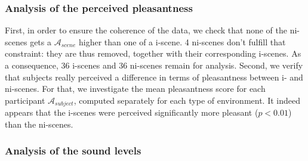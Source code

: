 \documentclass[12pt]{elsarticle}
\begin{document}
\subsubsection*{Analysis of the perceived pleasantness}


First, in order to ensure the coherence of the data, we check that none of the ni-scenes gets a $\mathcal{A}_{scene}$ higher than one of a i-scene. 4 ni-scenes don't fulfill that constraint: they are thus removed, together with their corresponding i-scenes. As a consequence, 36 i-scenes and 36 ni-scenes remain for analysis. Second, we verify that subjects really perceived a difference in terms of pleasantness between i- and ni-scenes. For that, we investigate the mean pleasantness score for each participant $\mathcal{A}_{subject}$, computed separately for each type of environment. It indeed appears that the i-scenes were perceived significantly more pleasant ($p < 0.01$) than the ni-scenes.

\subsubsection*{Analysis of the sound levels}
\end{document}
